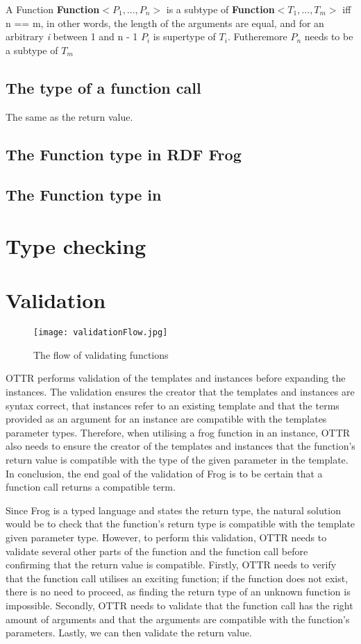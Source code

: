 \para
A Function \textbf{Function$<P_1,...,P_n>$} is a subtype of \textbf{Function$<T_1,...,T_m>$} iff n == m, in other words, the length of the arguments are equal, and for an arbitrary \textit{i} between 1 and n - 1  \textbf{$P_i$} is supertype of \textbf{$T_i$}. Futheremore \textbf{$P_n$} needs to be a subtype of \textbf{$T_m$}

\subsection{The type of a function call}
The same as the return value.

\subsection{The Function type in RDF Frog}

\subsection{The Function type in }

\section{Type checking}

\section{Validation}
\begin{figure}
    \centering
    \texttt{[image: validationFlow.jpg]}
    \caption{The flow of validating functions}
    \label{fig:LC-explenations}
\end{figure}

OTTR performs validation of the templates and instances before expanding the instances. The validation ensures the creator that the templates and instances are syntax correct, that instances refer to an existing template and that the terms provided as an argument for an instance are compatible with the templates parameter types. Therefore, when utilising a frog function in an instance, OTTR also needs to ensure the creator of the templates and instances that the function's return value is compatible with the type of the given parameter in the template. In conclusion, the end goal of the validation of Frog is to be certain that a function call returns a compatible term. 

\para
Since Frog is a typed language and states the return type, the natural solution would be to check that the function's return type is compatible with the template given parameter type. However, to perform this validation, OTTR needs to validate several other parts of the function and the function call before confirming that the return value is compatible. Firstly, OTTR needs to verify that the function call utilises an exciting function; if the function does not exist, there is no need to proceed, as finding the return type of an unknown function is impossible. Secondly, OTTR needs to validate that the function call has the right amount of arguments and that the arguments are compatible with the function's parameters. Lastly, we can then validate the return value. 

